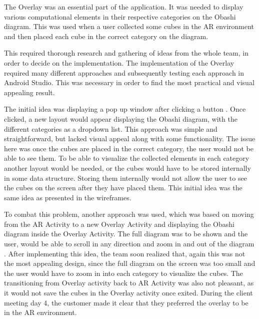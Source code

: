 \documentclass{l3proj}
\begin{document}
The Overlay was an essential part of the application. It was needed to display
various computational elements in their respective categories on the Obashi diagram. 
This was used when a user collected some cubes in the AR environment and then placed 
each cube in the correct category on the diagram.

This required thorough research and gathering of ideas from the whole team, in order 
to decide on the implementation. The implementation of the Overlay required many different
approaches and subsequently testing each approach in Android Studio. This was necessary in order 
to find the most practical and visual appealing result. 

The initial idea was displaying a pop up window after clicking a button \cite{PopUpWindow}.
Once clicked, a new layout would appear displaying the Obashi diagram, with the
different categories as a dropdown list\cite{DropList}. This approach was simple and 
straightforward, but lacked visual appeal along with some functionality. The issue here 
was once the cubes are placed in the correct category, the user would not be able to see them. 
To be able to visualize the collected elements in each category another layout would be needed,
or the cubes would have to be stored internally in some data structure. Storing them internally 
would not allow the user to see the cubes on the screen after they have placed them. 
This initial idea was the same idea as presented in the wireframes.

To combat this problem, another approach was used, which was based on moving from the
AR Activity to a new Overlay Activity\cite{MovingActivities} and displaying the Obashi 
diagram inside the Overlay Activity. The full diagram was to be shown and the user, would 
be able to scroll in any direction and zoom in and out of the diagram \cite{Zooming}. After 
implementing this idea, the team soon realized that, again this was not the most appealing 
design, since the full diagram on the screen was too small and the user would have to zoom 
in into each category to visualize the cubes. The transitioning from Overlay activity back to 
AR Activity was also not pleasant, as it would not save the cubes in the Overlay activity once 
exited. During the client meeting day 4, the customer made it clear that they preferred the 
overlay to be in the AR environment.
\end{document}
